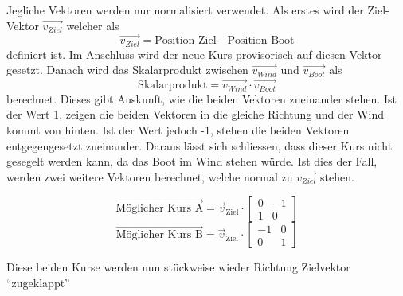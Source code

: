 Jegliche Vektoren werden nur normalisiert verwendet. Als erstes wird der Ziel-Vektor $\Vec{v_{Ziel}}$ welcher als $$\Vec{v_{Ziel}} = \text{Position Ziel - Position Boot}$$ definiert ist. Im Anschluss wird der neue Kurs provisorisch auf diesen Vektor gesetzt.
Danach wird das Skalarprodukt zwischen $\Vec{v_{Wind}}$ und $\Vec{v_{Boot}}$ als $$\text{Skalarprodukt} = \Vec{v_{Wind}} \cdot \Vec{v_{Boot}}$$ berechnet. Dieses gibt Auskunft, wie die beiden Vektoren zueinander stehen. Ist der Wert 1, zeigen die beiden Vektoren in die gleiche Richtung und der Wind kommt von hinten. Ist der Wert jedoch -1, stehen die beiden Vektoren entgegengesetzt zueinander. Daraus lässt sich schliessen, dass dieser Kurs nicht gesegelt werden kann, da das Boot im Wind stehen würde. Ist dies der Fall, werden zwei weitere Vektoren berechnet, welche normal zu $\Vec{v_{Ziel}}$ stehen. 

$$\vec{\text{Möglicher Kurs A}} = \vec{v}_{\text{Ziel}}  \cdot \begin{bmatrix}0 & -1 \\ 1 & 0\end{bmatrix} $$
$$\vec{\text{Möglicher Kurs B}} = \vec{v}_{\text{Ziel}} \cdot \begin{bmatrix}-1 & 0 \\ 0 & 1\end{bmatrix} $$

Diese beiden Kurse werden nun stückweise wieder Richtung Zielvektor \enquote{zugeklappt} 


